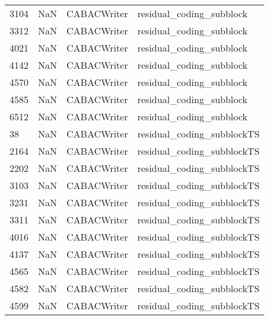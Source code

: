 \begin{tabular}{llll}
3104 &                   NaN &                CABACWriter &                  residual\_coding\_subblock \\
3312 &                   NaN &                CABACWriter &                  residual\_coding\_subblock \\
4021 &                   NaN &                CABACWriter &                  residual\_coding\_subblock \\
4142 &                   NaN &                CABACWriter &                  residual\_coding\_subblock \\
4570 &                   NaN &                CABACWriter &                  residual\_coding\_subblock \\
4585 &                   NaN &                CABACWriter &                  residual\_coding\_subblock \\
6512 &                   NaN &                CABACWriter &                  residual\_coding\_subblock \\
38   &                   NaN &                CABACWriter &                residual\_coding\_subblockTS \\
2164 &                   NaN &                CABACWriter &                residual\_coding\_subblockTS \\
2202 &                   NaN &                CABACWriter &                residual\_coding\_subblockTS \\
3103 &                   NaN &                CABACWriter &                residual\_coding\_subblockTS \\
3231 &                   NaN &                CABACWriter &                residual\_coding\_subblockTS \\
3311 &                   NaN &                CABACWriter &                residual\_coding\_subblockTS \\
4016 &                   NaN &                CABACWriter &                residual\_coding\_subblockTS \\
4137 &                   NaN &                CABACWriter &                residual\_coding\_subblockTS \\
4565 &                   NaN &                CABACWriter &                residual\_coding\_subblockTS \\
4582 &                   NaN &                CABACWriter &                residual\_coding\_subblockTS \\
4599 &                   NaN &                CABACWriter &                residual\_coding\_subblockTS \\

\end{tabular}
